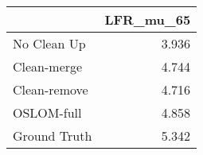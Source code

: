 \begin{tabular}{lr}
\toprule
{} & LFR_mu_65 \\
\midrule
No Clean Up  &     3.936 \\
Clean-merge  &     4.744 \\
Clean-remove &     4.716 \\
OSLOM-full   &     4.858 \\
Ground Truth &     5.342 \\
\bottomrule
\end{tabular}
